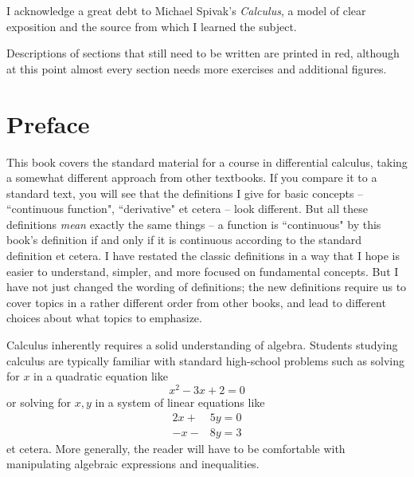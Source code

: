 \documentclass[12pt, oneside]{article}   	%
\begin{document}
I acknowledge a great debt to Michael Spivak's \emph{Calculus}, a model of clear exposition and the source from which I learned the subject.

{\color{red}Descriptions of sections that still need to be written are printed in red, although at this point almost every section needs more exercises and additional figures.}


\section*{Preface}
This book covers the standard material for a course in differential calculus, taking a somewhat different approach from other textbooks. If you compare it to a standard text, you will see that the definitions I give for basic concepts -- ``continuous function", ``derivative" et cetera -- look different. But all these definitions \emph{mean} exactly the same things -- a function is ``continuous" by this book's definition if and only if it is continuous according to the standard definition et cetera. I have restated the classic definitions in a way that I hope is easier to understand, simpler, and more focused on fundamental concepts. But I have not just changed the wording of definitions; the new definitions require us to cover topics in a rather different order from other books, and lead to different choices about what topics to emphasize. 
 
Calculus inherently requires a solid understanding of algebra. Students studying calculus are typically familiar with standard high-school problems such as solving for $x$ in a quadratic equation like
\[
x^2 - 3x + 2 = 0 
\]
or solving for $x,y$ in a system of  linear equations like
\begin{align*}
2x +& 5y = 0\\
-x -& 8y = 3
\end{align*}
et cetera. More generally, the reader will have to be comfortable with manipulating algebraic expressions and inequalities. %

\end{document}
